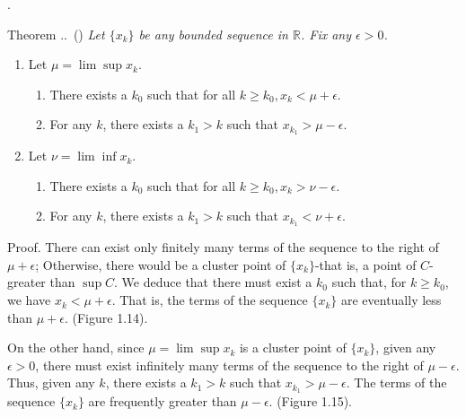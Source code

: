 \documentclass[8pt]{beamer}
\newcounter{thm}
\newcounter{ex}
\renewcommand{\thethm}{\thesection.\thesubsection.\arabic{thm}}
\renewenvironment{theorem}[1][]{%
    \refstepcounter{thm}%
    \begin{block}{Theorem \thethm\if\relax\detokenize{#1}\relax\else\ (#1)\fi}%
    \itshape
}{%
    \end{block}%
}
\newcommand{\mbb}[1]{\mathbb{#1}}
\begin{document}
\begin{frame}{.}
    \begin{theorem} \label{th:1.3.17}
        Let $\{x_k\}$ be any bounded sequence in $\mbb{R}$.
        Fix any $\epsilon > 0$.
        \begin{enumerate}
            \item Let $\mu = \lim \sup x_k$.
            \begin{enumerate}
                \item There exists a $k_0$ such that for all $k \geq k_0, x_k < \mu +\epsilon$.
                \item For any $k$, there exists a $k_1 >k$ such that $x_{k_1} > \mu - \epsilon$.
            \end{enumerate}
            \item Let $\nu = \lim \inf x_k$.
            \begin{enumerate}
                \item There exists a $k_0$ such that for all $k \ge k_0, x_k > \nu - \epsilon$.
                \item For any $k$, there exists a $k_1 > k$ such that $x_{k_1} < \nu + \epsilon$.
            \end{enumerate}
        \end{enumerate}
        Proof. There can exist only finitely many terms of the sequence to the right of $\mu + \epsilon$;
        Otherwise, there would be a cluster point of $\{x_k\}$-that is, a point of $C$-greater than $\sup C$.
        We deduce that there must exist a $k_0$ such that, for $k \geq k_0$, we have $x_k < \mu + \epsilon$.
        That is, the terms of the sequence $\{x_k\}$ are eventually less than $\mu + \epsilon$. (Figure 1.14).

        On the other hand, since $\mu = \lim \sup x_k$ is a cluster point of $\{x_k\}$, given any $\epsilon >0$, there must exist infinitely many terms of the sequence to the right of $\mu - \epsilon$.
        Thus, given any $k$, there exists a $k_1 > k$ such that $x_{k_1} > \mu - \epsilon$.
        The terms of the sequence $\{x_k\}$ are frequently greater than $\mu - \epsilon$. (Figure 1.15).
    \end{theorem}

    \begin{figure}
        \centering
\end{figure}
\end{frame}
\end{document}
